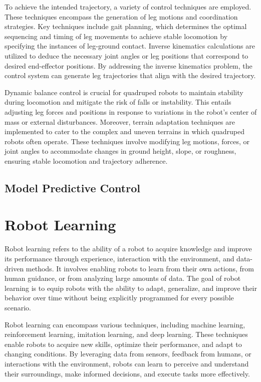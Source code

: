 To achieve the intended trajectory, a variety of control techniques are employed. These techniques encompass the generation of leg motions and coordination strategies. Key techniques include gait planning, which determines the optimal sequencing and timing of leg movements to achieve stable locomotion by specifying the instances of leg-ground contact. Inverse kinematics calculations are utilized to deduce the necessary joint angles or leg positions that correspond to desired end-effector positions. By addressing the inverse kinematics problem, the control system can generate leg trajectories that align with the desired trajectory.

Dynamic balance control is crucial for quadruped robots to maintain stability during locomotion and mitigate the risk of falls or instability. This entails adjusting leg forces and positions in response to variations in the robot's center of mass or external disturbances. Moreover, terrain adaptation techniques are implemented to cater to the complex and uneven terrains in which quadruped robots often operate. These techniques involve modifying leg motions, forces, or joint angles to accommodate changes in ground height, slope, or roughness, ensuring stable locomotion and trajectory adherence.
\subsection{Model Predictive Control}


\section{Robot Learning}
Robot learning refers to the ability of a robot to acquire knowledge and improve its performance through experience, interaction with the environment, and data-driven methods. It involves enabling robots to learn from their own actions, from human guidance, or from analyzing large amounts of data. The goal of robot learning is to equip robots with the ability to adapt, generalize, and improve their behavior over time without being explicitly programmed for every possible scenario.

Robot learning can encompass various techniques, including machine learning, reinforcement learning, imitation learning, and deep learning. These techniques enable robots to acquire new skills, optimize their performance, and adapt to changing conditions. By leveraging data from sensors, feedback from humans, or interactions with the environment, robots can learn to perceive and understand their surroundings, make informed decisions, and execute tasks more effectively.

